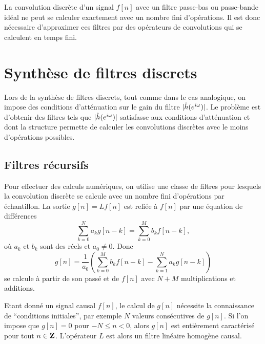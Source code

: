 La convolution discr\`ete d'un signal $f[n]$ avec un filtre
passe-bas ou passe-bande id\'eal ne peut se calculer exactement
avec un nombre fini d'op\'erations. Il est donc n\'ecessaire
d'approximer ces filtres par des op\'erateurs de convolutions
qui se calculent en temps fini.


\section{Synth\`ese de filtres discrets}

Lors de la synth\`ese de filtres discrets, tout comme dans le
cas analogique, on impose des conditions
d'att\'enuation sur le gain du filtre $|\hat h ({e ^{i \omega}})|$.
Le probl\`eme est d'obtenir des filtres tels
que $|\hat h ({e ^{i \omega}})|$ satisfasse aux conditions d'att\'enuation et
dont la structure permette de calculer les convolutions discr\`etes
avec le moins d'op\'erations possibles.

\subsection{Filtres r\'ecursifs}
\label{recursifs}
Pour effectuer des calculs num\'eriques, on utilise
une classe de filtres pour lesquels la convolution discr\`ete
se calcule avec un nombre fini d'op\'erations par
\'echantillon.
La sortie $g[n] = Lf[n]$ est reli\'ee \`a $f[n]$
par une \'equation de diff\'erences
\begin{equation}
\label{recurr}
\sum_{k=0}^N a_k g[n-k] = \sum_{k=0}^M b_k f[n-k] ,
\end{equation}
o\`u $a_k$ et $b_k$ sont des r\'eels et $a_0 \neq 0$.
Donc
\[
g[n] = \frac 1 {a_0} \left(
\sum_{k=0}^M b_k f[n-k] - \sum_{k=1}^N a_k g[n-k] \right)
\]
se calcule \`a partir de son pass\'e et de $f[n]$ avec
$N+M$ multiplications et additions.

Etant donn\'e un signal causal $f[n]$, le calcul de $g[n]$
n\'ecessite la connaissance de ``conditions initiales'',
par exemple $N$ valeurs cons\'ecutives de $g[n]$.
Si l'on impose que $g[n] = 0$ pour $-N \leq n < 0$, alors
$g[n]$ est enti\`erement caract\'eris\'e pour tout $n \in {\bf{Z}}$.
L'op\'erateur $L$ est alors un filtre lin\'eaire homog\`ene causal.

